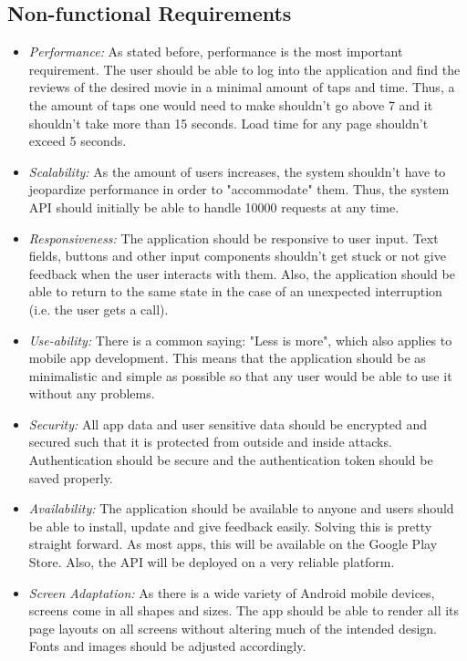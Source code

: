\documentclass[12pt,a4paper,twoside]{report}
\begin{document}
\subsection{Non-functional Requirements}
\begin{itemize}
    \item \textit{Performance:} As stated before, performance is the most important requirement. The user should be able to log into the application and find the reviews of the desired movie in a minimal amount of taps and time. Thus, a the amount of taps one would need to make shouldn't go above 7 and it shouldn't take more than 15 seconds. Load time for any page shouldn't exceed 5 seconds.
    \item \textit{Scalability:} As the amount of users increases, the system shouldn't have to jeopardize performance in order to "accommodate" them. Thus, the system API should initially be able to handle 10000 requests at any time.
    \item \textit{Responsiveness:} The application should be responsive to user input. Text fields, buttons and other input components shouldn't get stuck or not give feedback when the user interacts with them. Also, the application should be able to return to the same state in the case of an unexpected interruption (i.e. the user gets a call).
    \item \textit{Use-ability:} There is a common saying: "Less is more", which also applies to mobile app development. This means that the application should be as minimalistic and simple as possible so that any user would be able to use it without any problems.
    \item \textit{Security:} All app data and user sensitive data should be encrypted and secured such that it is protected from outside and inside attacks. Authentication should be secure and the authentication token should be saved properly.
    \item \textit{Availability:} The application should be available to anyone and users should be able to install, update and give feedback easily. Solving this is pretty straight forward. As most apps, this will be available on the Google Play Store. Also, the API will be deployed on a very reliable platform.
    \item \textit{Screen Adaptation:} As there is a wide variety of Android mobile devices, screens come in all shapes and sizes. The app should be able to render all its page layouts on all screens without altering much of the intended design. Fonts and images should be adjusted accordingly.
\end{itemize}
\end{document}

